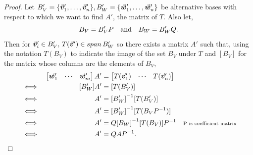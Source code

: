 \documentclass[MathsNotesBase.tex]{subfiles}
\begin{document}
{		\bigskip
		\begin{proof}
			Let ${ B_V' = \{\vec{\bm{v}}_1',\dots,\vec{\bm{v}}_n'\}, B_W' = \{\vec{\bm{w}}_1',\dots,\vec{\bm{w}}_n'\} }$ be alternative bases with respect to which we want to find $A'$, the matrix of $T$. Also let,
			\[ B_V = B_V'P \hspace{10pt}\text{and}\hspace{10pt} B_W = B_W'Q. \]
			Then for ${ \vec{\bm{v}}_i' \in B_V',\, T(\vec{\bm{v}}') \in span\,B_W' }$ so there exists a matrix $A'$ such that, using the notation $T(B_V)$ to indicate the image of the set $B_V$ under $T$ and $[B_V]$ for the matrix whose columns are the elements of $B_V$,
			\begin{align*}
			&& \begin{bmatrix}
				\vec{\bm{w}}_1' & \cdots & \vec{\bm{w}}_m'
				\end{bmatrix}
				A'&=
				\begin{bmatrix}
				T(\vec{\bm{v}}_1') & \cdots & T(\vec{\bm{v}}_n')
				\end{bmatrix}  \\
			&\iff & [B_W']A' &= [T(B_V')] &\text{\scriptsize{}} \\
			&\iff & A' &= {[B_W']}^{-1}[T(B_V')] &\text{\scriptsize{}} \\
			&\iff & A' &= {[B_W']}^{-1}[T(B_V{P}^{-1})] &\text{\scriptsize{}} \\
			&\iff & A' &= Q{[B_W]}^{-1}[T(B_V)]{P}^{-1} &\text{\scriptsize{P is coefficient matrix}} \\
			&\iff & A' &= QA{P}^{-1}. &\qedhere \\
			\end{align*}
		\end{proof}
	
		\bigskip
}
\end{document}
